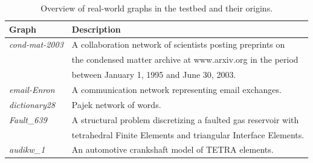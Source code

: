 \begin{table}[!h]
\centering
\caption{Overview of real-world graphs in the testbed and their origins.}
\label{tab:real-graphs}
\begin{tabular}{ll}
{\bf Graph} & {\bf Description} \\ \hline \hline
{\it cond-mat-2003} \cite{Newman06042004} & A collaboration network of scientists posting preprints 
on \\ & the condensed matter archive at www.arxiv.org in the period \\ 
& between January 1, 1995 and June 30, 2003. \\ \hline
{\it email-Enron} \cite{Leskovec:2005:GOT:1081870.1081893} & A communication network representing
email exchanges. \\
\hline %
{\it dictionary28} \cite{pajek2006} & Pajek network of words. \\ \hline
{\it Fault\_639} \cite{Ferronato20083922} & A structural problem discretizing a faulted gas reservoir with \\
& tetrahedral Finite Elements and triangular Interface Elements. \\ \hline
{\it audikw\_1} \cite{Davis97theuniversity} & An automotive crankshaft model of TETRA elements. \\ \hline

\end{tabular}
\end{table}
